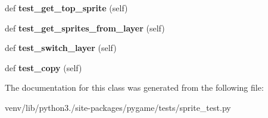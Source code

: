 \begin{DoxyCompactItemize}
\item 
\mbox{\label{classpygame_1_1tests_1_1sprite__test_1_1_layered_group_base_a493dcc7da7932352f14686ca3af64f9f}} 
def {\bfseries test\+\_\+get\+\_\+top\+\_\+sprite} (self)
\item 
\mbox{\label{classpygame_1_1tests_1_1sprite__test_1_1_layered_group_base_aa85f34e117b85ba99ce9a0e4e3e18112}} 
def {\bfseries test\+\_\+get\+\_\+sprites\+\_\+from\+\_\+layer} (self)
\item 
\mbox{\label{classpygame_1_1tests_1_1sprite__test_1_1_layered_group_base_a35c294724ddf752cbecf974b95d74b86}} 
def {\bfseries test\+\_\+switch\+\_\+layer} (self)
\item 
\mbox{\label{classpygame_1_1tests_1_1sprite__test_1_1_layered_group_base_ae27b2a9648530eba66f727cb5255bfe3}} 
def {\bfseries test\+\_\+copy} (self)
\end{DoxyCompactItemize}


The documentation for this class was generated from the following file\+:\begin{DoxyCompactItemize}
\item 
venv/lib/python3./site-\/packages/pygame/tests/sprite\+\_\+test.\+py\end{DoxyCompactItemize}
